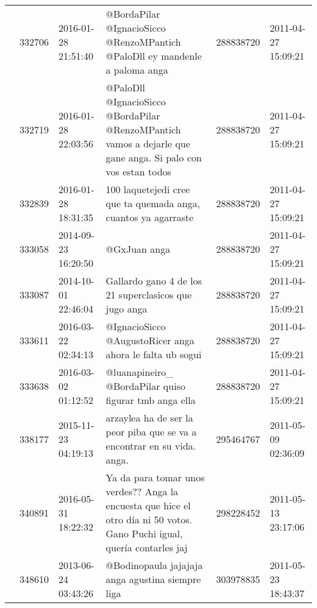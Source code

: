 \begin{tabular}{llllrl}
           & 332706  & 2016-01-28 21:51:40 &                                                                  @BordaPilar @IgnacioSicco @RenzoMPantich @PaloDll ey mandenle a paloma anga &   288838720 & 2011-04-27 15:09:21 \\
           & 332719  & 2016-01-28 22:03:56 &                                 @PaloDll @IgnacioSicco @BordaPilar @RenzoMPantich vamos a dejarle que gane anga. Si palo con vos estan todos &   288838720 & 2011-04-27 15:09:21 \\
           & 332839  & 2016-01-28 18:31:35 &                                                                               100 laquetejedi cree que ta quemada anga, cuantos ya agarraste &   288838720 & 2011-04-27 15:09:21 \\
           & 333058  & 2014-09-23 16:20:50 &                                                                                                                                 @GxJuan anga &   288838720 & 2011-04-27 15:09:21 \\
           & 333087  & 2014-10-01 22:46:04 &                                                                                        Gallardo gano 4 de los 21 superclasicos que jugo anga &   288838720 & 2011-04-27 15:09:21 \\
           & 333611  & 2016-03-22 02:34:13 &                                                                                     @IgnacioSicco @AugustoRicer anga ahora le falta ub sogui &   288838720 & 2011-04-27 15:09:21 \\
           & 333638  & 2016-03-02 01:12:52 &                                                                                       @luanapineiro\_ @BordaPilar quiso figurar tmb anga ella &   288838720 & 2011-04-27 15:09:21 \\
           & 338177  & 2015-11-23 04:19:13 &                                                                      arzaylea ha de ser la peor piba que se va a encontrar en su vida. anga. &   295464767 & 2011-05-09 02:36:09 \\
           & 340891  & 2016-05-31 18:22:32 &                     Ya da para tomar unos verdes?? Anga la encuesta que hice el otro día ni 50 votos. Gano Puchi igual, quería contarles jaj &   298228452 & 2011-05-13 23:17:06 \\
           & 348610  & 2013-06-24 03:43:26 &                                                                                             @Bodinopaula jajajaja anga agustina siempre liga &   303978835 & 2011-05-23 18:43:37 \\

\end{tabular}
